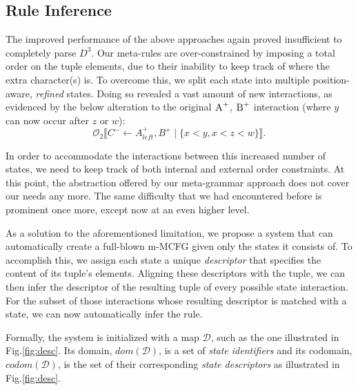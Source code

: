 \documentclass[nonatbib,numbers,10pt]{llncs}
\newcommand\s{\textsc}
\newcommand{\Orderr}[5]{
	\mathcal{#1}_{#5}\llbracket #2 \leftarrow #3 \mid \{ #4 \} \rrbracket.
}
\newcommand{\Or}[4]{\Orderr{O}{#1}{#2}{#3}{#4}}
\begin{document}
\subsection{Rule Inference}\label{aris}	
The improved performance of the above approaches again proved insufficient to completely parse $D^3$. Our meta-rules are over-constrained by imposing a total order on the tuple elements, due to their inability to keep track of where the extra character(s) is. To overcome this, we split each state into multiple position-aware, \textit{refined} states. Doing so revealed a vast amount of new interactions, as evidenced by the below alteration to the original $\s{A}^+$, $\s{B}^+$ interaction (where $y$ can now occur after $z$ or $w$):
\[
\Or{C^-}{A^+_{left}, B^+}{x < y, x < z < w}{2}
\]

In order to accommodate the interactions between this increased number of states, we need to keep track of both internal and external order constraints. At this point, the abstraction offered by our meta-grammar approach does not cover our needs any more. The same difficulty that we had encountered before is prominent once more, except now at an even higher level. 

As a solution to the aforementioned limitation, we propose a system that can automatically create a full-blown m-MCFG given only the states it consists of. To accomplish this, we assign each state a unique \textit{descriptor} that specifies the content of its tuple's elements. Aligning these descriptors with the tuple, we can then infer the descriptor of the resulting tuple of every possible state interaction. For the subset of those interactions whose resulting descriptor is matched with a state, we can now automatically infer the rule.

Formally, the system is initialized with a map $\mathcal{D}$, such as the one illustrated in Fig.\ref{fig:desc}. Its domain, $dom(\mathcal{D})$, is a set of \textit{state identifiers} and its codomain, $codom(\mathcal{D})$, is the set of their corresponding \textit{state descriptors} as illustrated in Fig.\ref{fig:desc}.
\end{document}
